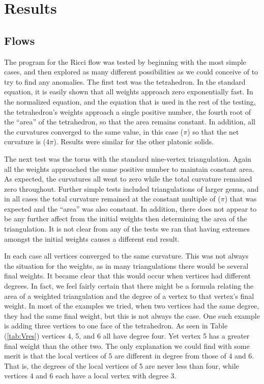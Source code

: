 \documentclass[12pt]{article}
\begin{document}
\section{Results}

\subsection{Flows}

The program for the Ricci flow was tested by beginning with the most simple cases, and then explored as many different possibilities as we could conceive of to try to find any anomalies. The first test was the tetrahedron. In the standard equation, it is easily shown that all weights approach zero exponentially fast. In the normalized equation, and the equation that is used in the rest of the testing, the tetrahedron's weights approach a single positive number, the fourth root of the ``area'' of the tetrahedron, so that the area remains constant. In addition, all the curvatures converged to the same value, in this case ($\pi$) so that the net curvature is ($4\pi$). Results were similar for the other platonic solids.\newline

\noindent The next test was the torus with the standard nine-vertex triangulation. Again all the weights approached the same positive number to maintain constant area. As expected, the curvatures all went to zero while the total curvature remained zero throughout. Further simple tests included triangulations of larger genus, and in all cases the total curvature remained at the constant multiple of ($\pi$) that was expected and the ``area'' was also constant. In addition, there does not appear to be any further affect from the initial weights then determining the area of the triangulation. It is not clear from any of the tests we ran that having extremes amongst the initial weights causes a different end result.\newline

\noindent In each case all vertices converged to the same curvature. This was not always the situation for the weights, as in many triangulations there would be several final weights. It became clear that this would occur when vertices had different degrees. In fact, we feel fairly certain that there might be a formula relating the area of a weighted triangulation and the degree of a vertex to that vertex's final weight. In most of the examples we tried, when two vertices had the same degree, they had the same final weight, but this is not always the case. One such example is adding three vertices to one face of the tetrahedron. As seen in Table (\ref{tab:Vres}) vertices 4, 5, and 6 all have degree four. Yet vertex 5 has a greater final weight than the other two. The only explanation we could find with some merit is that the local vertices of 5 are different in degree from those of 4 and 6. That is, the degrees of the local vertices of 5 are never less than four, while vertices 4 and 6 each have a local vertex with degree 3.
\end{document}
